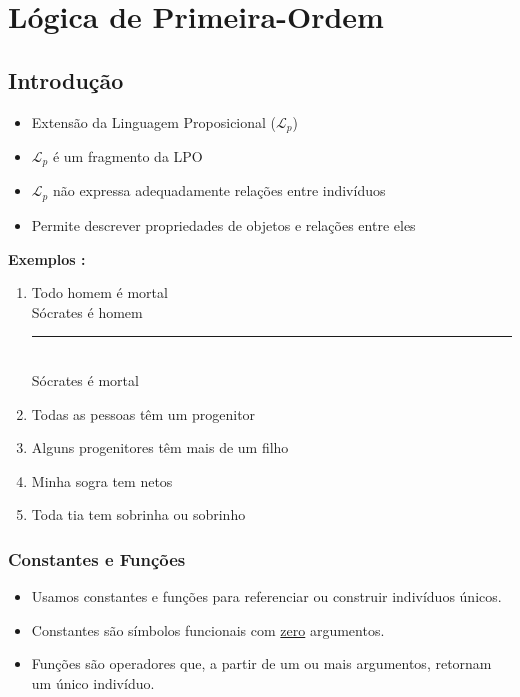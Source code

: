 \section{Lógica de Primeira-Ordem}
    

    \subsection{Introdução}

        \begin{itemize}[left=0.5cm, align=left, nosep]
            \item Extensão da Linguagem Proposicional ($\mathcal{L}_{p}$) 
            \item $\mathcal{L}_{p}$ é um fragmento da LPO
            \item $\mathcal{L}_{p}$ não expressa adequadamente relações entre indivíduos
            \item Permite descrever propriedades de objetos e relações entre eles
        \end{itemize}

        \textbf{Exemplos :}
        \begin{enumerate}[left=0.5cm, align=left, nosep]
            \item Todo homem é mortal \\
                Sócrates é homem \\ 
                \rule{4.5cm}{0.4pt} \\
                Sócrates é mortal
            \item Todas as pessoas têm um progenitor
            \item Alguns progenitores têm mais de um filho
            \item Minha sogra tem netos
            \item Toda tia tem sobrinha ou sobrinho
        \end{enumerate} 

        \subsubsection*{Constantes e Funções}
            \begin{itemize}[left=0.5cm, align=left, nosep]
                \item Usamos constantes e funções para referenciar ou construir indivíduos únicos.
                \item Constantes são símbolos funcionais com \underline{zero} argumentos.
                \item Funções são operadores que, a partir de um ou mais argumentos, retornam um único indivíduo.
            \end{itemize}

